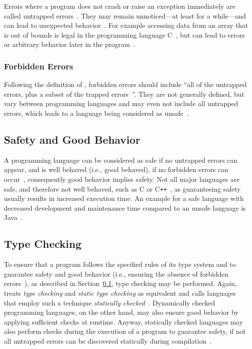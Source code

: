 Errors where a program does not crash or raise an exception immediately are called untrapped errors~\cite[p.~37]{TypeSystems:Cardelli:2004}. They may remain unnoticed---at least for a while---and can lead to unexpected behavior~\cite[p.~3]{TypeSystems:Cardelli:2004}. For example accessing data from an array that is out of bounds is legal in the programming language C~\cite[p.~7]{TypesAndProgrammingLanguages:Pierce:2002}, but can lead to errors or arbitrary behavior later in the program~\cite[p.~3]{TypeSystems:Cardelli:2004}.

\subsubsection{Forbidden Errors}

Following the definition of \citeauthor{TypeSystems:Cardelli:2004}, forbidden errors should include ``all of the untrapped errors, plus a subset of the trapped errors~\cite[p.~3]{TypeSystems:Cardelli:2004}''. They are not generally defined, but vary between programming languages and may even not include all untrapped errors, which leads to a language being  considered as unsafe~\cite[p.~4]{TypeSystems:Cardelli:2004}.

\subsection{Safety and Good Behavior}
\label{sec:safety-good-behavior}

A programming language can be considered as safe if no untrapped errors can appear, and is well behaved (i.e., good behaved), if no forbidden errors can occur~\cite[p.~3]{TypeSystems:Cardelli:2004}, consequently good behavior implies safety. Not all major languages are safe, and therefore not well behaved, such as C or C\texttt{++}~\cite[p.~6]{TypesAndProgrammingLanguages:Pierce:2002}, as guaranteeing safety usually results in increased execution time. An example for a safe language with decreased development and maintenance time compared to an unsafe language is Java~\cite[p.~5]{TypeSystems:Cardelli:2004}.

\subsection{Type Checking}
\label{sec:type-checking}

To ensure that a program follows the specified rules of its type system and to guarantee safety and good behavior (i.e., ensuring the absence of forbidden errors~\cite[p.~37]{TypeSystems:Cardelli:2004}), as described in Section~\ref{sec:safety-good-behavior}, type checking may be performed. Again, \citeauthor{TypeSystems:Cardelli:2004} treats \emph{type checking} and \emph{static type checking} as equivalent and calls languages that employ such a technique \emph{statically checked}~\cite[p.~3]{TypeSystems:Cardelli:2004}. Dynamically checked programming languages, on the other hand, may also ensure good behavior by applying sufficient checks at runtime. Anyway, statically checked languages may also perform checks during the execution of a program to guarantee safety, if not all untrapped errors can be discovered statically during compilation~\cite[p.~4]{TypeSystems:Cardelli:2004}.

